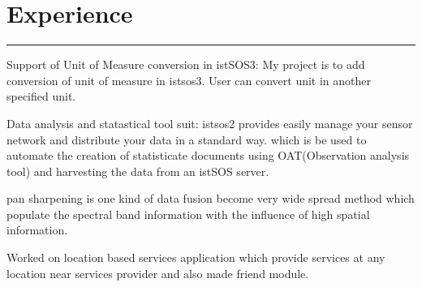 \documentclass[]{sahana}
\begin{document}
\begin{minipage}[t]{0.66\textwidth} 
\section{Experience}
\noindent\rule{12.5cm}{0.4pt}
 
\noindent
\hspace{5em}%
\begin{minipage}{0.85\textwidth\vspace{2pt}}
Support of Unit of Measure conversion in istSOS3: My project is to add conversion of
unit of measure in istsos3. User can convert unit in another specified unit.
\end{minipage}
\sectionsep

 
\noindent
\hspace{5em}%
\begin{minipage}{0.85\textwidth\vspace{2pt}}
Data analysis and statastical tool suit: istsos2 provides easily manage your sensor network
and distribute your data in a standard way. which is be used to automate the creation of statisticate
documents using OAT(Observation analysis tool) and harvesting the data from an istSOS server.
\end{minipage}
\sectionsep

 
\noindent
\hspace{5em}%
\begin{minipage}{0.85\textwidth\vspace{2pt}}
pan sharpening is one kind of data fusion become very wide spread method which populate the spectral band information with the influence of high spatial information.
\end{minipage}
\sectionsep

 
\noindent
\hspace{5em}%
\begin{minipage}{0.85\textwidth\vspace{2pt}}
Worked on location based services application which provide services at any location near
services provider and also made friend module.
\end{minipage}

\end{minipage}
\end{document}
